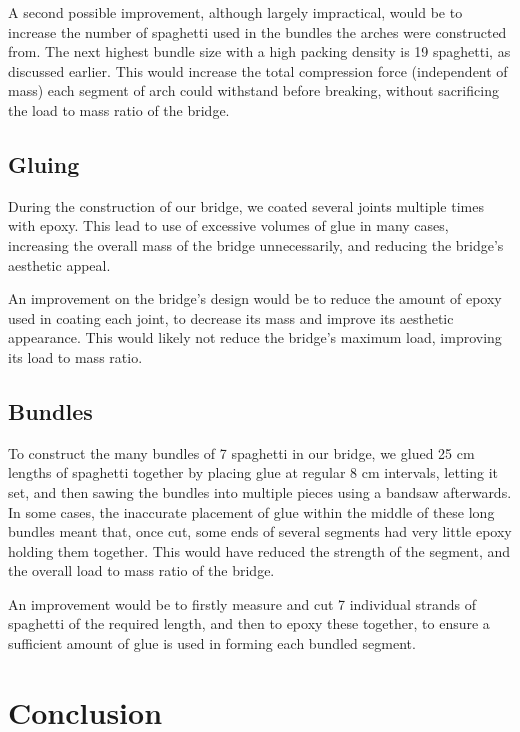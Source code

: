 \documentclass[a4paper,11pt]{article}
\begin{document}
A second possible improvement, although largely impractical, would be to
increase the number of spaghetti used in the bundles the arches were constructed
from.
The next highest bundle size with a high packing density is 19 spaghetti, as
discussed earlier.
This would increase the total compression force (independent of mass) each
segment of arch could withstand before breaking, without sacrificing the load to
mass ratio of the bridge.


\subsection{Gluing}

During the construction of our bridge, we coated several joints multiple times
with epoxy.
This lead to use of excessive volumes of glue in many cases, increasing the
overall mass of the bridge unnecessarily, and reducing the bridge's aesthetic
appeal.

An improvement on the bridge's design would be to reduce the amount of epoxy
used in coating each joint, to decrease its mass and improve its aesthetic
appearance.
This would likely not reduce the bridge's maximum load, improving its load to
mass ratio.


\subsection{Bundles}

To construct the many bundles of 7 spaghetti in our bridge, we glued 25 cm
lengths of spaghetti together by placing glue at regular 8 cm intervals, letting
it set, and then sawing the bundles into multiple pieces using a bandsaw
afterwards.
In some cases, the inaccurate placement of glue within the middle of these long
bundles meant that, once cut, some ends of several segments had very little
epoxy holding them together.
This would have reduced the strength of the segment, and the overall load to
mass ratio of the bridge.

An improvement would be to firstly measure and cut 7 individual strands of
spaghetti of the required length, and then to epoxy these together, to ensure a
sufficient amount of glue is used in forming each bundled segment.



\section{Conclusion}
\end{document}
